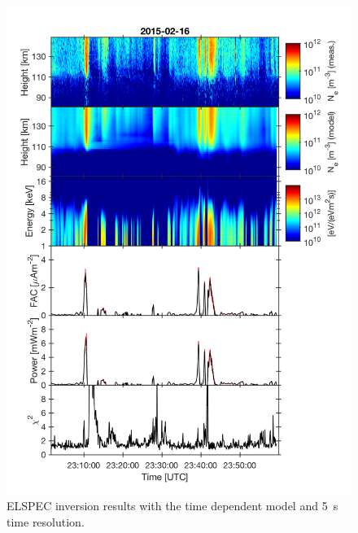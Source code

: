 \documentclass[12pt,a4paper]{report}
\begin{document}
\begin{figure}[ht]
\begin{center}
\includegraphics[width=\textwidth]{ElSpec_20150216T230135-20150216T235955_beata_uhf_Fang_SheehanGr_integrate_6_1_dump.png}
\caption{ELSPEC inversion results with the time dependent model and 5~s time resolution. }
\label{figElSpecOut}
\end{center}
\end{figure}
\end{document}

